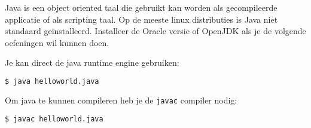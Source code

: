 Java is een object oriented taal die gebruikt kan worden als gecompileerde applicatie of als scripting taal. Op de meeste linux distributies is Java niet standaard ge\"installeerd. Installeer de Oracle versie of OpenJDK als je de volgende oefeningen wil kunnen doen.



Je kan direct de java runtime engine gebruiken:
\begin{lstlisting}[language=bash]
$ java helloworld.java
\end{lstlisting}

Om java te kunnen compileren heb je de \texttt{javac} compiler nodig:
\begin{lstlisting}[language=bash]
$ javac helloworld.java
\end{lstlisting}

